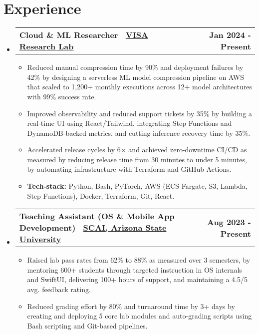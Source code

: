 \documentclass[a4paper, 10pt]{article}
\makeatletter
\newcommand{\resumeExperienceHeading}[2]{
    \item
    \begin{tabular*}{\textwidth}[t]{l@{\extracolsep{\fill}}r}
    \textbf{#1} & \textbf{#2}
    \end{tabular*}
    \vspace{-15pt}
}
\makeatother
\begin{document}
\section{Experience}
    \vspace{-5pt}
    \begin{itemize}[itemsep=1pt,leftmargin=0in, label={}]
        \resumeExperienceHeading{Cloud \& ML Researcher \textbar\ \href{https://visa.lab.asu.edu/}{VISA Research Lab}}{Jan 2024 - Present}
        \begin{itemize}[itemsep=1pt]
            \item Reduced manual compression time by 90\% and deployment failures by 42\% by designing a serverless ML model compression pipeline on AWS that scaled to 1,200+ monthly executions across 12+ model architectures with 99\% success rate.       
            
            \item Improved observability and reduced support tickets by 35\% by building a real-time UI using React/Tailwind, integrating Step Functions and DynamoDB-backed metrics, and cutting inference recovery time by 35\%.
            
            \item Accelerated release cycles by 6× and achieved zero-downtime CI/CD as measured by reducing release time from 30 minutes to under 5 minutes, by automating infrastructure with Terraform and GitHub Actions.
            
            \item \textbf{Tech-stack:} Python, Bash, PyTorch, AWS (ECS Fargate, S3, Lambda, Step Functions), Docker, Terraform, Git, React.
        \end{itemize}
        \vspace{-5pt}

        \resumeExperienceHeading{Teaching Assistant (OS \& Mobile App Development) \textbar\ \href{https://scai.engineering.asu.edu/}{SCAI, Arizona State University}}{Aug 2023 - Present}
        \begin{itemize}[itemsep=1pt]
            \item Raised lab pass rates from 62\% to 88\% as measured over 3 semesters, by mentoring 600+ students through targeted instruction in OS internals and SwiftUI, delivering 100+ hours of support, and maintaining a 4.5/5 avg. feedback rating.
            
            \item Reduced grading effort by 80\% and turnaround time by 3+ days by creating and deploying 5 core lab modules and auto-grading scripts using Bash scripting and Git-based pipelines.
            

\end{itemize}
\end{itemize}
\end{document}
